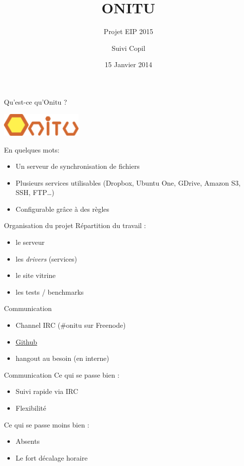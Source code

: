 \documentclass{beamer}
\begin{document}
\title[Suivi Copil]{ONITU}
\subtitle[]{Projet EIP 2015}
\author[Onitu]{Suivi Copil}
\date[short date]{15 Janvier 2014}

\begin{frame}
\titlepage
\end{frame}

\begin{frame}{Qu'est-ce qu'Onitu ?}
\begin{center} 
  \includegraphics[width=0.3\textwidth]{onitu.png}
\end{center} 
En quelques mots:
\begin{itemize}
  \item Un serveur de synchronisation de fichiers
  \item Plusieurs services utilisables (Dropbox, Ubuntu One, GDrive, Amazon S3, SSH, FTP…)
  \item Configurable grâce à des règles
\end{itemize}
\end{frame}

\begin{frame}{Organisation du projet}
Répartition du travail :
\begin{itemize}
  \item le serveur
  \item les \emph{drivers} (services)
  \item le site vitrine
  \item les tests / benchmarks
\end{itemize}
\end{frame}

\begin{frame}{Communication}
\begin{itemize}
  \item Channel IRC (\#onitu sur Freenode)
  \item \underline{\hyperlink{https://github.com/onitu}{Github}}
  \item hangout au besoin (en interne)
\end{itemize}
\end{frame}

\begin{frame}{Communication}
Ce qui se passe bien :
\begin{itemize}
  \item Suivi rapide via IRC
  \item Flexibilité
\end{itemize}
Ce qui se passe moins bien :
\begin{itemize}
  \item Absents
  \item Le fort décalage horaire
\end{itemize}
\end{frame}
\end{document}
